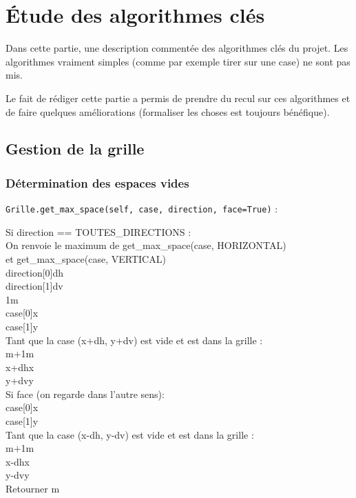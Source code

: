 \chapter{Étude des algorithmes clés}\label{algo_liste}
Dans cette partie, une description commentée des algorithmes clés du projet. Les algorithmes vraiment simples (comme par exemple tirer sur une case) ne sont pas mis.

Le fait de rédiger cette partie a permis de prendre du recul sur ces algorithmes et de faire quelques améliorations (formaliser les choses est toujours bénéfique).
\section{Gestion de la grille}


\subsection{Détermination des espaces vides}\label{get_max_space}
\texttt{Grille.get\_max\_space(self, case, direction, face=True)} :
\begin{algo1}
Si direction == TOUTES\_DIRECTIONS :\\
 On renvoie le maximum de get\_max\_space(case, HORIZONTAL)\\
 et get\_max\_space(case, VERTICAL)\\
direction[0]\sto dh\\
direction[1]\sto dv\\
1\sto m\\
case[0]\sto x\\
case[1]\sto y\\
Tant que la case (x+dh, y+dv) est vide et est dans la grille :\\
m+1\sto m\\
x+dh\sto x\\
y+dv\sto y\\
Si face (on regarde dans l'autre sens):\\
case[0]\sto x\\
case[1]\sto y\\
Tant que la case (x-dh, y-dv) est vide et est dans la grille :\\
m+1\sto m\\
x-dh\sto x\\
y-dv\sto y\\
Retourner m\\
\end{algo1}

